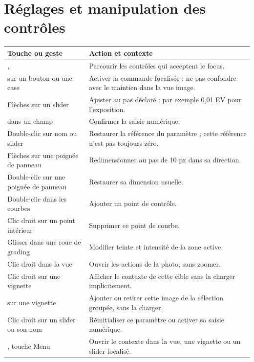 \section*{Réglages et manipulation des contrôles}
\begin{longtable}{@{}L{4.4cm}L{9.2cm}@{}}
\toprule Touche ou geste & Action et contexte\\\midrule\endhead
{},  & Parcourir les contrôles qui acceptent le focus.\\
 sur un bouton ou une case & Activer la commande focalisée ; ne pas confondre avec le maintien dans la vue image.\\
Flèches sur un slider & Ajuster au pas déclaré : par exemple 0,01 EV pour l’exposition.\\
 dans un champ & Confirmer la saisie numérique.\\
Double-clic sur nom ou slider & Restaurer la référence du paramètre ; cette référence n’est pas toujours zéro.\\
Flèches sur une poignée de panneau & Redimensionner au pas de 10 px dans sa direction.\\
Double-clic sur une poignée de panneau & Restaurer sa dimension usuelle.\\
Double-clic dans les courbes & Ajouter un point de contrôle.\\
Clic droit sur un point intérieur & Supprimer ce point de courbe.\\
Glisser dans une roue de grading & Modifier teinte et intensité de la zone active.\\
Clic droit dans la vue & Ouvrir les actions de la photo, sans zoomer.\\
Clic droit sur une vignette & Afficher le contexte de cette cible sans la charger implicitement.\\
 sur une vignette & Ajouter ou retirer cette image de la sélection groupée, sans la charger.\\
Clic droit sur un slider ou son nom & Réinitialiser ce paramètre ou activer sa saisie numérique.\\
, touche Menu & Ouvrir le contexte dans la vue, une vignette ou un slider focalisé.\\
\bottomrule
\end{longtable}


